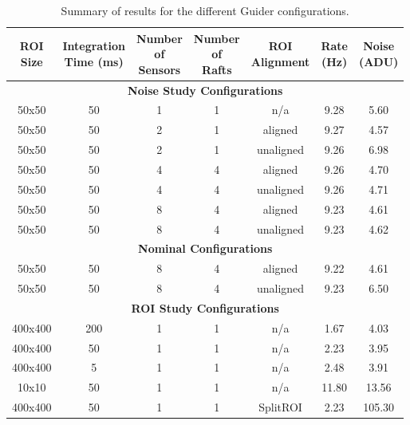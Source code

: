 \begin{longtable}{|c|c|c|c|c|c|c|}
\caption{Summary of results for the different Guider configurations. \label{tab:gds_configs}} \\
\hline
\makecell{\textbf{ROI} \\ \textbf{Size}} & 
\makecell{\textbf{Integration} \\ \textbf{Time (ms)}} & 
\makecell{\textbf{Number} \\ \textbf{of} \\ \textbf{Sensors}} &
\makecell{\textbf{Number} \\ \textbf{of} \\ \textbf{Rafts}} &
\makecell{\textbf{ROI} \\ \textbf{Alignment}} &
\makecell{\textbf{Rate} \\ \textbf{(Hz)}} &
\makecell{\textbf{Noise} \\ \textbf{(ADU)}} \\
\hline
\hline
\endhead
\multicolumn{7}{|c|}{\textbf{Noise Study Configurations}} \\
\hline
50x50   & 50  & 1 & 1 & n/a       &  9.28 & 5.60 \\ %
50x50   & 50  & 2 & 1 & aligned   &  9.27 & 4.57 \\ %
50x50   & 50  & 2 & 1 & unaligned &  9.26 & 6.98 \\ %
50x50   & 50  & 4 & 4 & aligned   &  9.26 & 4.70 \\ %
50x50   & 50  & 4 & 4 & unaligned &  9.26 & 4.71 \\ %
50x50   & 50  & 8 & 4 & aligned   &  9.23 & 4.61 \\ %
50x50   & 50  & 8 & 4 & unaligned &  9.23 & 4.62 \\ %
\hline
\multicolumn{7}{|c|}{\textbf{Nominal Configurations}} \\
\hline
50x50   & 50  & 8 & 4 & aligned   &  9.22 & 4.61 \\ %
50x50   & 50  & 8 & 4 & unaligned &  9.23 & 6.50 \\ %
\hline
\multicolumn{7}{|c|}{\textbf{ROI Study Configurations}} \\
\hline
400x400 & 200 & 1 & 1 & n/a       &  1.67 & 4.03 \\ %
400x400 &  50 & 1 & 1 & n/a       &  2.23 & 3.95 \\ %
400x400 &   5 & 1 & 1 & n/a       &  2.48 & 3.91 \\ %
10x10   &  50 & 1 & 1 & n/a       & 11.80 & 13.56 \\ %
400x400 &  50 & 1 & 1 & SplitROI  &  2.23 & 105.30 \\ %
\hline
\end{longtable}

